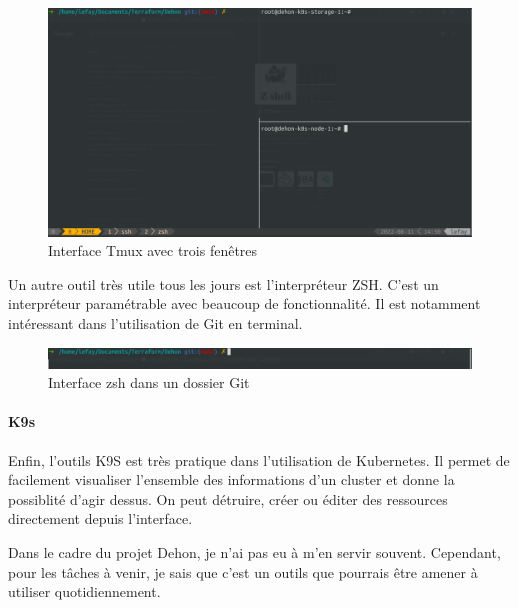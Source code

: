 \documentclass[12pt]{article}
\begin{document}
\begin{figure}[!ht]
    \centering
        \includegraphics[width=\textwidth]{src/interface_tmux.png}
    \caption{Interface Tmux avec trois fenêtres}
    \label{fig:tmux}
\end{figure}

Un autre outil très utile tous les jours est l'interpréteur ZSH.
C'est un interpréteur paramétrable avec beaucoup de fonctionnalité.
Il est notamment intéressant dans l'utilisation de Git en terminal.

\begin{figure}[!ht]
    \centering
        \includegraphics[width=\textwidth]{src/interface_shell.png}
    \caption{Interface zsh dans un dossier Git}
    \label{fig:zsh}
\end{figure}

\newpage
\paragraph{K9s}

Enfin, l'outils K9S est très pratique dans l'utilisation de \gls{Kubernetes}.
Il permet de facilement visualiser l'ensemble des informations d'un \gls{cluster} et donne la possiblité d'agir dessus.
On peut détruire, créer ou éditer des ressources directement depuis l'interface.

Dans le cadre du projet Dehon, je n'ai pas eu à m'en servir souvent.
Cependant, pour les tâches à venir, je sais que c'est un outils que pourrais être amener à utiliser quotidiennement.
\end{document}
